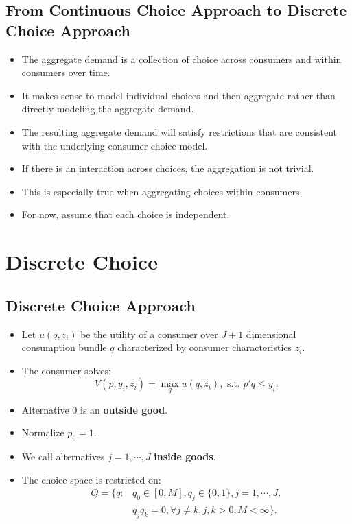 \documentclass[
]{book}
\providecommand{\tightlist}{%
  \setlength{\itemsep}{0pt}\setlength{\parskip}{0pt}}
\begin{document}
\hypertarget{from-continuous-choice-approach-to-discrete-choice-approach}{%
\subsection{From Continuous Choice Approach to Discrete Choice Approach}\label{from-continuous-choice-approach-to-discrete-choice-approach}}

\begin{itemize}
\tightlist
\item
  The aggregate demand is a collection of choice across consumers and within consumers over time.
\item
  It makes sense to model individual choices and then aggregate rather than directly modeling the aggregate demand.
\item
  The resulting aggregate demand will satisfy restrictions that are consistent with the underlying consumer choice model.
\item
  If there is an interaction across choices, the aggregation is not trivial.
\item
  This is especially true when aggregating choices within consumers.
\item
  For now, assume that each choice is independent.
\end{itemize}

\hypertarget{discrete-choice}{%
\section{Discrete Choice}\label{discrete-choice}}

\hypertarget{discrete-choice-approach}{%
\subsection{Discrete Choice Approach}\label{discrete-choice-approach}}

\begin{itemize}
\tightlist
\item
  Let \(u(q, z_i)\) be the utility of a consumer over \(J + 1\) dimensional consumption bundle \(q\) characterized by consumer characteristics \(z_i\).
\item
  The consumer solves:
  \begin{equation}
  V(p, y_i, z_i) = \max_{q}u(q, z_i), \text{   s.t.   } p'q \le y_i.
  \end{equation}
\item
  Alternative \(0\) is an \textbf{outside good}.
\item
  Normalize \(p_0 = 1\).
\item
  We call alternatives \(j = 1, \cdots, J\) \textbf{inside goods}.
\item
  The choice space is restricted on:
  \begin{equation}
  \begin{split}
  Q = \{q:& q_0 \in [0, M], q_j \in \{0, 1\}, j = 1, \cdots, J,\\
  & q_j q_k = 0, \forall j \neq k, j, k > 0, M < \infty\}.
  \end{split}
  \end{equation}
\end{itemize}
\end{document}
